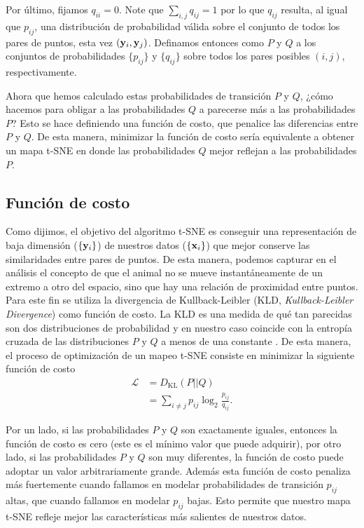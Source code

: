 Por último, fijamos $q_{ii} = 0$. Note que $\sum_{i,j} q_{ij} = 1$ por lo que $q_{ij}$ resulta, al igual que $p_{ij}$, una distribución de probabilidad válida sobre el conjunto de todos los pares de puntos, esta vez $(\vb{y}_i, \vb{y}_j)$. Definamos entonces como $P$ y $Q$ a los conjuntos de probabilidades $\{p_{ij}\}$ y $\{q_{ij}\}$ sobre todos los pares posibles $(i,j)$, respectivamente.

Ahora que hemos calculado estas probabilidades de transición $P$ y $Q$, ¿cómo hacemos para obligar a las probabilidades $Q$ a parecerse más a las probabilidades $P$? Esto se hace definiendo una función de costo, que penalice las diferencias entre $P$ y $Q$. De esta manera, minimizar la función de costo sería equivalente a obtener un mapa t-SNE en donde las probabilidades $Q$ mejor reflejan a las probabilidades $P$.

\subsection{Función de costo}\label{subsec:tsne_costo}

Como dijimos, el objetivo del algoritmo t-SNE es conseguir una representación de baja dimensión ($\{\vb{y}_i\}$) de nuestros datos ($\{\vb{x}_i\}$) que mejor conserve las similaridades entre pares de puntos. De esta manera, podemos capturar en el análisis el concepto de que el animal no se mueve instantáneamente de un extremo a otro del espacio, sino que hay una relación de proximidad entre puntos. Para este fin se utiliza la divergencia de Kullback-Leibler (KLD, \textit{Kullback-Leibler Divergence}) como función de costo. La KLD es una medida de qué tan parecidas son dos distribuciones de probabilidad y en nuestro caso coincide con la entropía cruzada de las distribuciones $P$ y $Q$ a menos de una constante \cite{vdm_tsne}. De esta manera, el proceso de optimización de un mapeo t-SNE consiste en minimizar la siguiente función de costo
\begin{align}
    \mathcal{L} &= D_{\mathrm{KL}}\left(P||Q\right)\\
    &= \sum_{i\neq j} p_{ij} \log_2\frac{p_{ij}}{q_{ij}}.
\end{align}

Por un lado, si las probabilidades $P$ y $Q$ son exactamente iguales, entonces la función de costo es cero (este es el mínimo valor que puede adquirir), por otro lado, si las probabilidades $P$ y $Q$ son muy diferentes, la función de costo puede adoptar un valor arbitrariamente grande. Además esta función de costo penaliza más fuertemente cuando fallamos en modelar probabilidades de transición $p_{ij}$ altas, que cuando fallamos en modelar $p_{ij}$ bajas. Esto permite que nuestro mapa t-SNE refleje mejor las características más salientes de nuestros datos.

